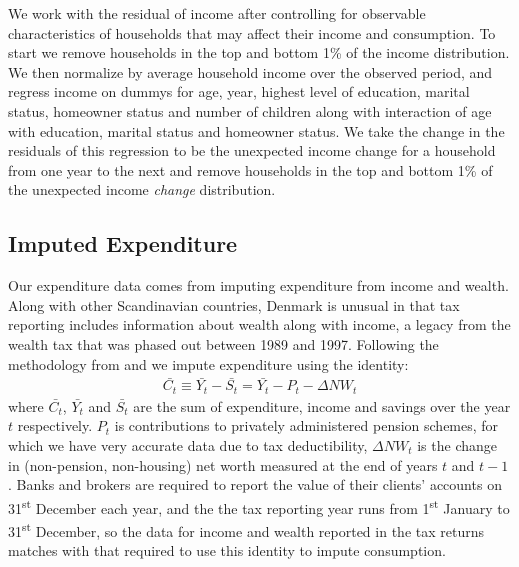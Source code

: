 \documentclass[titlepage]{\econtex}\newcommand{\texname}{ConsumptionHeterogeneity}
\begin{document}
We work with the residual of income after controlling for observable characteristics of households that may affect their income and consumption. To start we remove households in the top and bottom 1\% of the income distribution. We then normalize by average household income over the observed period, and regress income on dummys for age, year, highest level of education, marital status, homeowner status and number of children along with interaction of age with education, marital status and homeowner status. We take the change in the residuals of this regression to be the unexpected income change for a household from one year to the next and remove households in the top and bottom 1\% of the unexpected income \textit{change} distribution.

\subsection{Imputed Expenditure} \label{cons_imputation}
Our expenditure data comes from imputing expenditure from income and wealth. Along with other Scandinavian countries, Denmark is unusual in that tax reporting includes information about wealth along with income, a legacy from the wealth tax that was phased out between 1989 and 1997. Following the methodology from \cite{browning_imputing_2003} and \cite{fagereng_imputing_2015} we impute expenditure using the identity:
\begin{align*}
\bar{C_t} \equiv \bar{Y_t} - \bar{S_t} = \bar{Y_t} - P_t - \Delta NW_t 
\end{align*}
where $\bar{C_t}$, $\bar{Y_t}$ and $\bar{S_t}$  are the sum of expenditure, income and savings over the year $t$ respectively. $P_t$ is contributions to privately administered pension schemes, for which we have very accurate data due to tax deductibility, $\Delta NW_t$ is the change in (non-pension, non-housing) net worth measured at the end of years $t$ and $t-1$. Banks and brokers are required to report the value of their clients' accounts on 31\textsuperscript{st} December each year, and the the tax reporting year runs from 1\textsuperscript{st} January to 31\textsuperscript{st} December, so the data for income and wealth reported in the tax returns matches with that required to use this identity to impute consumption. 
\end{document}
